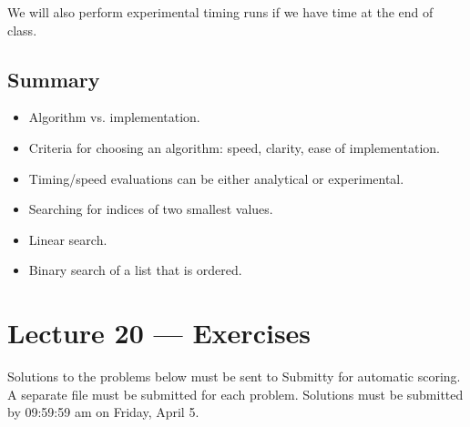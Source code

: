 \documentclass[letterpaper,10pt,english]{sphinxmanual}
\begin{document}
We will also perform experimental timing runs if we have time at the end
of class.


\section{Summary}
\label{\detokenize{lecture_notes/lec20_searching:summary}}\begin{itemize}
\item {} 
Algorithm vs. implementation.

\item {} 
Criteria for choosing an algorithm: speed, clarity, ease of
implementation.

\item {} 
Timing/speed evaluations can be either analytical or experimental.

\item {} 
Searching for indices of two smallest values.

\item {} 
Linear search.

\item {} 
Binary search of a list that is ordered.

\end{itemize}


\chapter{Lecture 20 — Exercises}
\label{\detokenize{lecture_notes/lec20_searching_exercises/exercises:lecture-20-exercises}}\label{\detokenize{lecture_notes/lec20_searching_exercises/exercises::doc}}
Solutions to the problems below must be sent to Submitty for
automatic scoring.  A separate file must be submitted for each problem.
Solutions must be submitted by 09:59:59 am on Friday, April 5.
\end{document}
